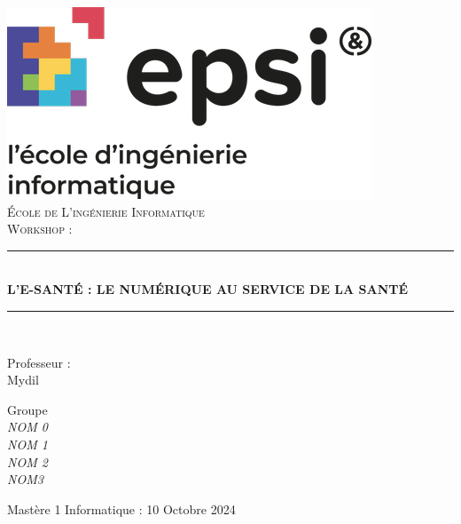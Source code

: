 \documentclass[12pt, openany]{report}
\newcommand{\HRule}{\rule{\linewidth}{0.5mm}}
\begin{document}
\begin{titlepage}
  \begin{sffamily}
    \begin{center}

      \includegraphics[scale=0.3]{image/logo_epsi.png}~\\[1.5cm]

      \textsc{\LARGE École de L’ingénierie Informatique}\\[2cm]

      \textsc{\Large Workshop : }\\[1cm]


      \HRule \\[0.4cm]
      { \huge \bfseries  L'E-SANTÉ : LE NUMÉRIQUE AU SERVICE DE LA SANTÉ \\[0.4cm] }

      \HRule \\[2cm]

      \begin{minipage}{0.4\textwidth}
        \begin{flushleft} \large
          Professeur \textsc{:}\\
          Mydil

        \end{flushleft}
      \end{minipage}
      \begin{minipage}{0.4\textwidth}
        \begin{flushright} \large
          {Groupe }\\
          \emph{NOM 0 \\ NOM 1 \\ NOM 2 \\ NOM3
             \\ }
        \end{flushright}
      \end{minipage}

      \vfill
      {\large Mastère 1 Informatique : 10 Octobre 2024}

    \end{center}
  \end{sffamily}
  \tableofcontents
\end{titlepage}
\end{document}
